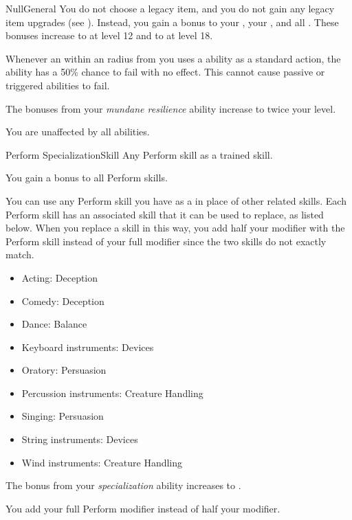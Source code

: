 \begin{feat}{Null}{General}
         You do not choose a legacy item, and you do not gain any legacy item upgrades (see ).
        Instead, you gain a  bonus to your , your , and all .
        These bonuses increase to  at level 12 and to  at level 18.

         Whenever an  within an \medarea radius from you uses a \magical ability as a standard action, the ability has a 50\% chance to fail with no effect.
        This cannot cause passive or triggered abilities to fail.

         The bonuses from your \textit{mundane resilience} ability increase to twice your level.

         You are unaffected by all \magical abilities.
    \end{feat}

    \begin{feat}{Perform Specialization}{Skill}
        \featpre Any Perform skill as a trained skill.

         You gain a  bonus to all Perform skills.

         You can use any Perform skill you have as a  in place of other related skills.
        Each Perform skill has an associated skill that it can be used to replace, as listed below.
        When you replace a skill in this way, you add half your modifier with the Perform skill instead of your full modifier since the two skills do not exactly match.
        \begin{itemize}
            \item Acting: Deception
            \item Comedy: Deception
            \item Dance: Balance
            \item Keyboard instruments: Devices
            \item Oratory: Persuasion
            \item Percussion instruments: Creature Handling
            \item Singing: Persuasion
            \item String instruments: Devices
            \item Wind instruments: Creature Handling
        \end{itemize}

         The bonus from your \textit{specialization} ability increases to .

         You add your full Perform modifier instead of half your modifier.
    \end{feat}

